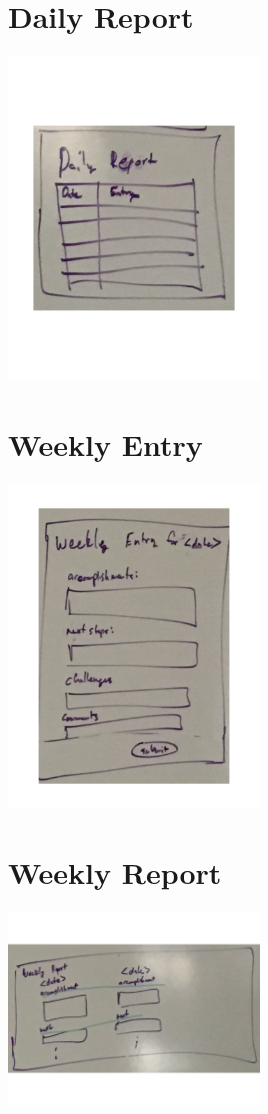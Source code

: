 \section*{Daily Report}
\begin{center}
\includegraphics[width=0.5\textwidth]{./mocks/daily_report.pdf}
\end{center}

\section*{Weekly Entry}
\begin{center}
\includegraphics[width=0.5\textwidth]{./mocks/weekly_entry.pdf}
\end{center}

\section*{Weekly Report}
\begin{center}
\includegraphics[width=0.5\textwidth]{./mocks/weekly_report.pdf}
\end{center}

